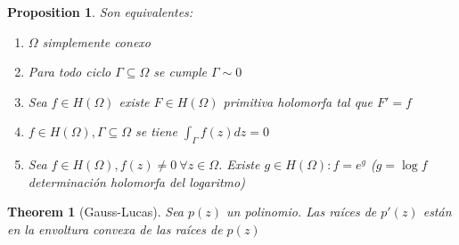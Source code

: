 \documentclass[leqno]{article}
\newtheorem*{theorem}{Theorem}
\newtheorem*{proposition}{Proposition}
\begin{document}
\begin{proposition} Son equivalentes:
\begin{enumerate}[topsep=-6pt, itemsep=0pt]
  \item $\Omega $ simplemente conexo
  \item Para todo ciclo $\Gamma \subseteq \Omega $ se cumple $\Gamma \sim 0$ 
  \item Sea $f\in H(\Omega )$ existe $F\in H(\Omega )$ primitiva holomorfa tal que $F' = f$
  \item $f\in H(\Omega ), \Gamma \subseteq \Omega$ se tiene $\int_\Gamma f(z)dz = 0$ 
  \item Sea  $f \in H(\Omega ), f(z)\neq 0 \ \forall z\in \Omega $. Existe $g \in H(\Omega ): f = e^g$ ($g=\log f$ determinación holomorfa del logaritmo)
\end{enumerate}
\end{proposition}

\begin{theorem}[Gauss-Lucas]
Sea $p(z)$ un polinomio. Las raíces de $p'(z)$ están en la envoltura convexa de las raíces de  $p(z)$
\end{theorem}
\end{document}
